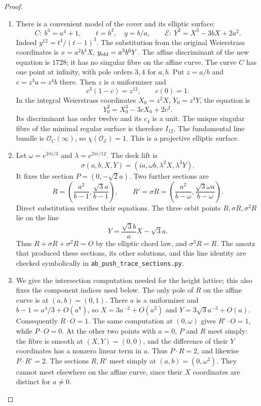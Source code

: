 \begin{proof}
\begin{enumerate}[label=\arabic*.,leftmargin=*]
\item There is a convenient model of the cover
and its elliptic surface:
\[
 C:\ b^3=a^4+1,\qquad
 t=b^3,\quad y=b/a,\qquad
 \mathscr E:\ Y^2=X^3-3bX+2a^2.
\]
Indeed $y^{12}=t^4/(t-1)^3$.
The substitution from the original
Weierstrass coordinates is
$x=a^2b^4X$, $y_{\rm old}=a^3b^6Y$.
The affine discriminant of the new
equation is $1728$; it has no singular
fibre on the affine curve. The curve
$C$ has one point at infinity, with
pole orders $3,4$ for $a,b$.
Put $z=a/b$ and $c=z^3a=z^4b$ there.
Then $z$ is a uniformizer and
\[
 c^3(1-c)=z^{12},\qquad c(0)=1.
\]
In the integral Weierstrass coordinates
$X_0=z^2X$, $Y_0=z^3Y$, the equation is
\[
 Y_0^2=X_0^3-3cX_0+2c^2.
\]
Its discriminant has order twelve and
its $c_4$ is a unit. The unique singular
fibre of the minimal regular surface
is therefore $I_{12}$. The fundamental
line bundle is $\mathcal O_C(\infty)$,
so $\chi(\mathcal O_{\mathscr E})=1$.
This is a projective elliptic surface.

\item Let $\omega=e^{2\pi i/3}$ and
$\lambda=e^{2\pi i/12}$. The deck lift is
\[
 \sigma(a,b,X,Y)=(ia,\omega b,\lambda^2X,\lambda^3Y).
\]
It fixes the section $P=(0,-\sqrt2a)$.
Two further sections are
\[
 R=\left(\frac{a^2}{b-1},
                 \frac{\sqrt3a}{b-1}\right),
 \qquad
 R'=\sigma R=
   \left(\frac{a^2}{b-\omega},
                 \frac{\sqrt3\omega a}{b-\omega}\right).
\]
Direct substitution verifies their
equations. The three orbit points
$R,\sigma R,\sigma^2R$ lie on the line
\[
 Y=\frac{\sqrt3b}{a}X-\sqrt3a.
\]
Thus $R+\sigma R+\sigma^2R=O$ by the
elliptic chord law, and $\sigma^3R=R$.
The ansatz that produced these sections,
its other solutions, and this line
identity are checked symbolically in
\texttt{ab\_push\_trace\_sections.py}.

\item We give the intersection computation
needed for the height lattice; this
also fixes the component indices used
below. The only pole of $R$ on the affine
curve is at $(a,b)=(0,1)$. There $a$ is
a uniformizer and $b-1=a^4/3+O(a^8)$,
so $X=3a^{-2}+O(a^2)$ and
$Y=3\sqrt3a^{-3}+O(a)$.
Consequently $R\cdot O=1$.
The same computation at $(0,\omega)$
gives $R'\cdot O=1$, while $P\cdot O=0$.
At the other two points with $a=0$,
$P$ and $R$ meet simply: the fibre is
smooth at $(X,Y)=(0,0)$, and the
difference of their $Y$ coordinates
has a nonzero linear term in $a$.
Thus $P\cdot R=2$, and likewise
$P\cdot R'=2$. The sections $R,R'$
meet simply at $(a,b)=(0,\omega^2)$.
They cannot meet elsewhere on the
affine curve, since their $X$
coordinates are distinct for $a\ne0$.


\end{enumerate}
\end{proof}
